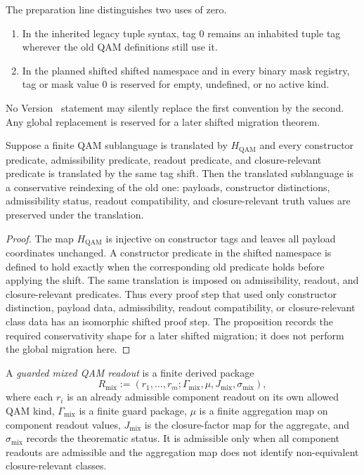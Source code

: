 \begin{definition}\label{def:pre-shift-reserved-zero-discipline}
The preparation line distinguishes two uses of zero.
\begin{enumerate}[leftmargin=2em]
 \item In the inherited legacy tuple syntax, tag 0 remains an inhabited tuple tag wherever the old QAM definitions still use it.
 \item In the planned shifted shifted namespace and in every binary mask registry, tag or mask value 0 is reserved for empty, undefined, or no active kind.
\end{enumerate}
No Version~\docversion{} statement may silently replace the first convention by the second. Any global replacement is reserved for a later shifted migration theorem.
\end{definition}

\begin{proposition}\label{prop:qam-hilbert-shift-conservative-shape}
Suppose a finite QAM sublanguage is translated by $H_{\mathrm{QAM}}$ and every constructor predicate, admissibility predicate, readout predicate, and closure-relevant predicate is translated by the same tag shift. Then the translated sublanguage is a conservative reindexing of the old one: payloads, constructor distinctions, admissibility status, readout compatibility, and closure-relevant truth values are preserved under the translation.
\end{proposition}

\begin{proof}
The map $H_{\mathrm{QAM}}$ is injective on constructor tags and leaves all payload coordinates unchanged. A constructor predicate in the shifted namespace is defined to hold exactly when the corresponding old predicate holds before applying the shift. The same translation is imposed on admissibility, readout, and closure-relevant predicates. Thus every proof step that used only constructor distinction, payload data, admissibility, readout compatibility, or closure-relevant class data has an isomorphic shifted proof step. The proposition records the required conservativity shape for a later shifted migration; it does not perform the global migration here.
\end{proof}

\begin{definition}\label{def:guarded-mixed-qam-readout}
A \emph{guarded mixed QAM readout} is a finite derived package
\[
 R_{\mathrm{mix}}
 :=
 (r_1,\ldots,r_m;\Gamma_{\mathrm{mix}},\mu,J_{\mathrm{mix}},\sigma_{\mathrm{mix}}),
\]
where each $r_i$ is an already admissible component readout on its own allowed QAM kind, $\Gamma_{\mathrm{mix}}$ is a finite guard package, $\mu$ is a finite aggregation map on component readout values, $J_{\mathrm{mix}}$ is the closure-factor map for the aggregate, and $\sigma_{\mathrm{mix}}$ records the theorematic status. It is admissible only when all component readouts are admissible and the aggregation map does not identify non-equivalent closure-relevant classes.
\end{definition}

